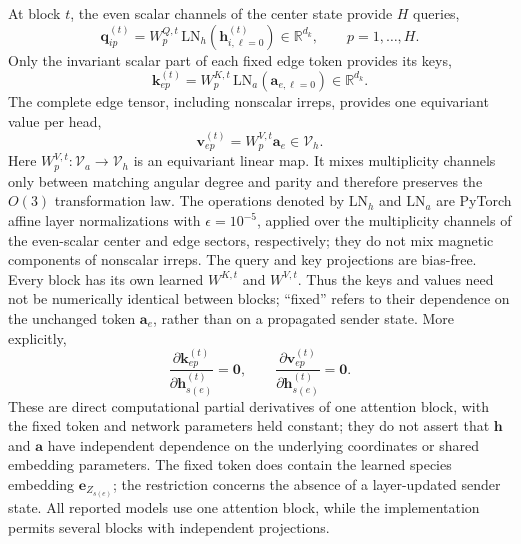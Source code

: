 \documentclass[aps,prx,preprint,notitlepage,superscriptaddress,nofootinbib,floatfix]{revtex4-2}
\newcommand{\vect}[1]{\bm{#1}}
\newif\ifshowrevisions
\newenvironment{draftthirtyoneblock}
  {\ifshowrevisions\color{draftthirtyonecolor}\fi}
  {}
\newcommand{\draftthirtytwo}[1]{%
  \ifshowrevisions\textcolor{draftthirtytwocolor}{#1}\else#1\fi}
\newenvironment{draftthirtytwoblock}
  {\ifshowrevisions\color{draftthirtytwocolor}\fi}
  {}
\begin{document}
\begin{draftthirtyoneblock}
At block \(t\), the even scalar channels of the center state provide \(H\)
queries,
\begin{equation}
 \vect q_{ip}^{(t)}
 =W_{p}^{Q,t}\,
 \mathrm{LN}_{h}\!\left(\vect h_{i,\ell=0}^{(t)}\right)
 \in\mathbb R^{d_k},
 \qquad p=1,\ldots,H .
 \label{eq:app-query}
\end{equation}
Only the invariant scalar part of each fixed edge token provides its keys,
\begin{equation}
 \vect k_{ep}^{(t)}
 =W_{p}^{K,t}\,
 \mathrm{LN}_{a}\!\left(\vect a_{e,\ell=0}\right)
 \in\mathbb R^{d_k}.
 \label{eq:app-key}
\end{equation}
The complete edge tensor, including nonscalar irreps, provides one equivariant
value per head,
\begin{equation}
 \vect v_{ep}^{(t)}
 =W_{p}^{V,t}\vect a_e
 \in\mathcal V_h .
 \label{eq:app-value}
\end{equation}
Here \(W_{p}^{V,t}:\mathcal V_a\rightarrow\mathcal V_h\) is an equivariant
linear map. It mixes multiplicity channels only between matching angular
degree and parity and therefore preserves the \(O(3)\) transformation law.
\begin{draftthirtytwoblock}
The operations denoted by \(\mathrm{LN}_{h}\) and \(\mathrm{LN}_{a}\) are
PyTorch affine layer normalizations with \(\epsilon=10^{-5}\), applied over
the multiplicity channels of the even-scalar center and edge sectors,
respectively; they do not mix magnetic components of nonscalar irreps. The
query and key projections are bias-free.
\end{draftthirtytwoblock}
Every block has its own learned \(W^{K,t}\) and \(W^{V,t}\). Thus the keys and
values need not be numerically identical between blocks; ``fixed'' refers to
their dependence on the unchanged token \(\vect a_e\), rather than on a
propagated sender state. More explicitly,
\begin{equation}
 \frac{\partial\vect k_{ep}^{(t)}}{\partial\vect h_{s(e)}^{(t)}}=\vect 0,
 \qquad
 \frac{\partial\vect v_{ep}^{(t)}}{\partial\vect h_{s(e)}^{(t)}}=\vect 0.
 \label{eq:app-fixed-dependency}
\end{equation}
\draftthirtytwo{These are direct computational partial derivatives of one
attention block, with the fixed token and network parameters held constant;
they do not assert that \(\vect h\) and \(\vect a\) have independent
dependence on the underlying coordinates or shared embedding parameters.}
The fixed token does contain the learned species embedding
\(\vect e_{Z_{s(e)}}\); the restriction concerns the absence of a
layer-updated sender state. All reported models use one attention block, while
the implementation permits several blocks with independent projections.


\end{draftthirtyoneblock}
\end{document}
